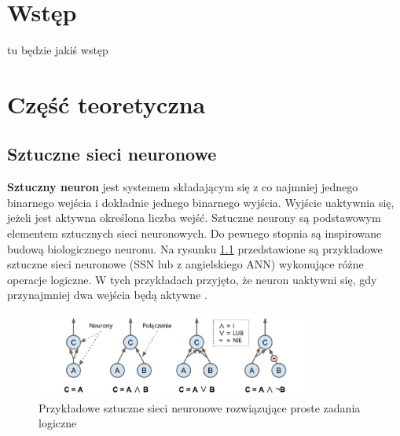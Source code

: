 \documentclass[12pt]{mwbk}
\theoremstyle{plain}
\theoremstyle{definition}
\theoremstyle{remark}
\newcommand\zrodlo[1]{\par\vspace{-3mm}{\small\textit{Źródło: }#1 }}
\begin{document}



\tableofcontents


\chapter*{Wstęp}

tu będzie jakiś wstęp

\chapter{Część teoretyczna}

\section{Sztuczne sieci neuronowe}

\textbf{Sztuczny neuron} jest systemem składającym się z co najmniej jednego binarnego wejścia i dokładnie jednego binarnego wyjścia. Wyjście uaktywnia się, jeżeli jest aktywna określona liczba wejść. Sztuczne neurony są podstawowym elementem sztucznych sieci neuronowych. Do pewnego stopnia są inspirowane budową biologicznego neuronu. Na rysunku \ref{fig:neurony1} przedstawione są przykładowe sztuczne sieci neuronowe (SSN lub z angielskiego ANN) wykonujące różne operacje logiczne. W tych przykładach przyjęto, że neuron uaktywni się, gdy przynajmniej dwa wejścia będą aktywne \cite{geron}.

\begin{figure}[!h]
	\centering
	\includegraphics[width=9cm]{rys/neurony1.png}
	\caption{Przykładowe sztuczne sieci neuronowe rozwiązujące proste zadania logiczne}
	\zrodlo{\cite{geron}}
	\label{fig:neurony1}
\end{figure}
\end{document}
